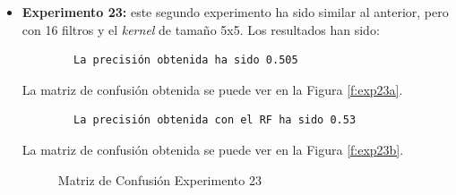 \begin{itemize}
    \item \textbf{Experimento 23:} este segundo experimento ha sido similar al anterior, pero con 16 filtros y el \emph{kernel} de tamaño 5x5. Los resultados han sido:
    \begin{verbatim}
        La precisión obtenida ha sido 0.505
    \end{verbatim}
    La matriz de confusión obtenida se puede ver en la Figura \ref{f:exp23a}.
    \begin{verbatim}        
        La precisión obtenida con el RF ha sido 0.53
    \end{verbatim}
    La matriz de confusión obtenida se puede ver en la Figura \ref{f:exp23b}.
    \begin{figure}[h]
     \centering
     \caption{Matriz de Confusión Experimento 23}
     \label{f:exp23}
    \end{figure}    
    

\end{itemize}
